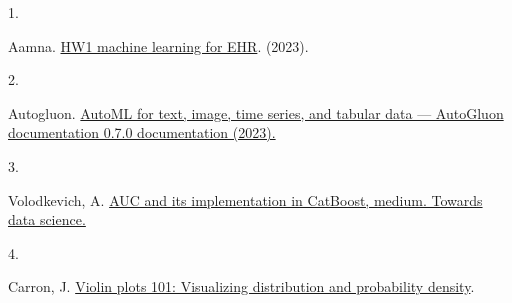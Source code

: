 \documentclass[
]{article}
\newlength{\cslhangindent}
\newlength{\csllabelwidth}
\newlength{\cslentryspacingunit} %
\newenvironment{CSLReferences}[2] %
 {%
  \setlength{\parindent}{0pt}
  \ifodd #1
  \let\oldpar\par
  \def\par{\hangindent=\cslhangindent\oldpar}
  \fi
  \setlength{\parskip}{#2\cslentryspacingunit}
 }%
 {}
\newcommand{\CSLLeftMargin}[1]{\parbox[t]{\csllabelwidth}{#1}}
\newcommand{\CSLRightInline}[1]{\parbox[t]{\linewidth - \csllabelwidth}{#1}\break}
\begin{document}
\hypertarget{refs}{}
\begin{CSLReferences}{0}{0}
\leavevmode{}%
\CSLLeftMargin{1. }%
\CSLRightInline{Aamna.
\href{https://kaggle.com/competitions/hw1-machine-learning-for-ehr}{HW1
machine learning for EHR}. (2023).}

\leavevmode{}%
\CSLLeftMargin{2. }%
\CSLRightInline{Autogluon.
\href{https://auto.gluon.ai/stable/index.html\%20(Accessed:\%2013\%20March\%202023).}{AutoML
for text, image, time series, and tabular data --- AutoGluon
documentation 0.7.0 documentation (2023).}}

\leavevmode{}%
\CSLLeftMargin{3. }%
\CSLRightInline{Volodkevich, A.
\href{\%20https://towardsdatascience.com/auc-and-its-implementation-in-catboost-6bc740c01f98\%20(Accessed:\%20March\%2013,\%202023)}{AUC
and its implementation in CatBoost, medium. Towards data science.}}

\leavevmode{}%
\CSLLeftMargin{4. }%
\CSLRightInline{Carron, J.
\href{https://mode.com/blog/violin-plot-examples/\%20(Accessed:\%20March\%2013,\%202023)}{Violin
plots 101: Visualizing distribution and probability density}.}

\end{CSLReferences}
\end{document}
